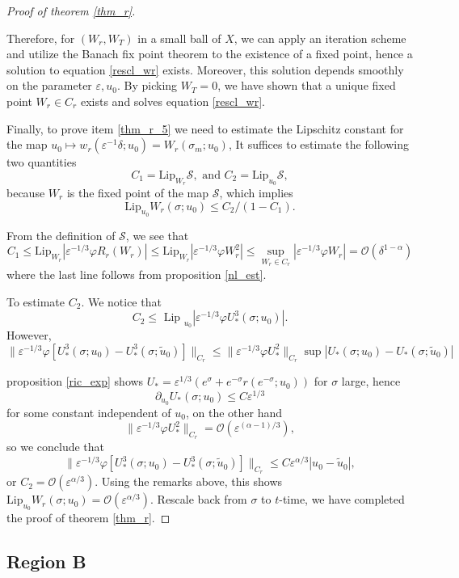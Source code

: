 \documentclass[letterpaper,11pt]{article}
\newcommand{\rmO}{\mathcal{O}}
\newcommand{\eps}{\varepsilon}
\numberwithin{equation}{section}
\theoremstyle{plain}
\begin{document}
\begin{proof}[Proof of theorem \ref{thm_r}]
\begin{itemize}
\end{itemize}

Therefore, for $(W_r,W_T)$ in a small ball of $X$, we can apply an iteration scheme and utilize the Banach fix point theorem to the existence of a fixed point, hence a solution to equation \eqref{rescl_wr} exists. Moreover, this solution depends smoothly on the parameter $\eps, u_0$. By picking $W_T = 0$, we have shown that a unique fixed point $W_r \in C_r$ exists and solves equation \eqref{rescl_wr}.


Finally, to prove item \ref{thm_r_5} we need to estimate the Lipschitz constant for the map $u_0 \mapsto w_r(\eps^{-1}\delta; u_0)=W_r(\sigma_m;u_0)$, It suffices to estimate the following two quantities
\[
C_1 = \text{Lip}_{W_r} \mathcal{S}, \text{ and }C_2 = \text{Lip}_{u_0} \mathcal{S},
\]
because $W_r$ is the fixed point of the map $\mathcal{S}$, which implies
\[
\text{Lip}_{u_0} W_r(\sigma;u_0) \le  C_2/(1-C_1).
\]

From the definition of $\mathcal{S}$, we see that
\[
C_1 \le \text{Lip}_{W_r} |\eps^{-1/3}\varphi R_r(W_r)|\le \text{Lip}_{W_r} |\eps^{-1/3}\varphi W_r^2| \le\sup_{W_r \in C_r} |\eps^{-1/3}\varphi W_r | = \rmO(\delta^{1-\alpha})
\]
where the last line follows from proposition \ref{nl_est}.


To estimate $C_2$. We notice that 
\[
C_2 \le \text{ Lip }_{u_0} |\eps^{-1/3}\varphi U_*^3(\sigma;u_0) |.
\]
However,
\[
\|\eps^{-1/3}\varphi [U_*^3(\sigma;u_0)-U_*^3(\sigma;\tilde{u}_0)] \|_{C_r} \le \|\eps^{-1/3}\varphi U_*^2 \|_{C_r} \sup|U_*(\sigma;u_0)-U_*(\sigma;\tilde{u}_0)|
\] 

proposition \ref{ric_exp} shows
$U_*= \eps^{1/3}(e^\sigma + e^{-\sigma} r(e^{-\sigma}; u_0))$ for $\sigma$ large, hence 
\[
\partial_{u_0} U_*(\sigma;u_0) \le C\eps^{1/3}
\]
for some constant independent of $u_0$, on the other hand
\[
\|\eps^{-1/3}\varphi U_*^2 \|_{C_r}  = \rmO(\eps^{(\alpha-1)/3}),
\]
so we conclude that
\[
\|\eps^{-1/3}\varphi [U_*^3(\sigma;u_0)-U_*^3(\sigma;\tilde{u}_0)] \|_{C_r} \le C\eps^{\alpha/3}|u_0 - \tilde{u}_0|,
\]
or $C_2 = \rmO(\eps^{\alpha/3})$. Using the remarks above, this shows $\text{Lip}_{u_0} W_r(\sigma; u_0) = \rmO(\eps^{\alpha/3})$. Rescale back from $\sigma$ to $t$-time, we have completed the proof of theorem \ref{thm_r}.
\end{proof}
\pagebreak 


\subsection{Region B}
\end{document}

